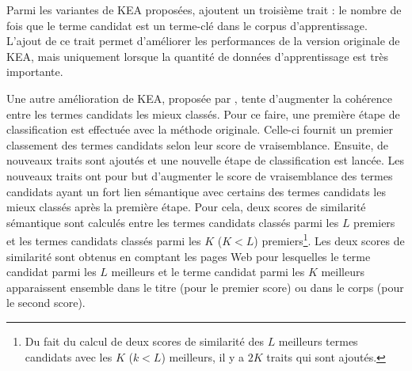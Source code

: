         Parmi les variantes de KEA proposées, \citet{frank1999keafrequency}
        ajoutent un troisième trait : le nombre de fois que le terme candidat est
        un terme-clé dans le corpus d'apprentissage. L'ajout de ce trait permet
        d'améliorer les performances de la version originale de KEA, mais
        uniquement lorsque la quantité de données d'apprentissage est très
        importante.
        
        Une autre amélioration de KEA, proposée par
        \citet{turney2003keacoherence}, tente d'augmenter la cohérence entre les
        termes candidats les mieux classés. Pour ce faire, une première étape de
        classification est effectuée avec la méthode originale. Celle-ci fournit
        un premier classement des termes candidats selon leur score de
        vraisemblance. Ensuite, de nouveaux traits sont ajoutés et une nouvelle
        étape de classification est lancée. Les nouveaux traits ont pour but
        d'augmenter le score de vraisemblance des termes candidats ayant un fort
        lien sémantique avec certains des termes candidats les mieux classés après la
        première étape. Pour cela, deux scores de similarité sémantique sont
        calculés entre les termes candidats classés parmi les $L$ premiers et les
        termes candidats classés parmi les $K$ ($K < L$) premiers\footnote{Du fait
        du calcul de deux scores de similarité des $L$ meilleurs termes candidats
        avec les $K$ ($k < L$) meilleurs, il y a $2K$ traits qui sont ajoutés.}.
        Les deux scores de similarité sont obtenus en comptant les pages Web pour
        lesquelles le terme candidat parmi les $L$ meilleurs et le terme candidat parmi les
        $K$ meilleurs apparaissent ensemble dans le titre (pour le premier score)
        ou dans le corps (pour le second score).

